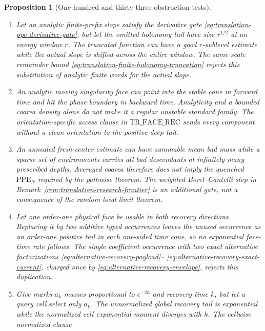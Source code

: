 \documentclass[11pt]{article}
\newtheorem{proposition}[theorem]{Proposition}
\begin{document}
\begin{proposition}[One hundred and thirty-three obstruction tests]
\begin{enumerate}[label=\textup{(T\arabic*)}]
      mixes, but their total signed bound need not decay.  The strict rate
      \eqref{eq:face-time-recovered-rate} rejects the missing aggregate
      complexity gap.
\item Let an analytic finite-prefix slope satisfy the derivative gate
      \eqref{eq:translation-ppe-derivative-gate}, but let the omitted
      holonomy tail have size $r^{1/2}$ at an energy window $r$.  The
      truncated function can have a good $r$-sublevel estimate while the
      actual slope is shifted across the entire window.  The same-scale
      remainder bound
      \eqref{eq:translation-finite-holonomy-truncation} rejects this
      substitution of analytic finite words for the actual slope.
\item An analytic moving singularity face can point into the stable cone in
      forward time and hit the phase boundary in backward time.  Analyticity
      and a bounded coarea density alone do not make it a regular unstable
      standard family.  The orientation-specific access clause in
      $\mathrm{TR\_FACE\_REC}$ sends every component without a clean
      orientation to the positive deep tail.
\item An annealed fresh-center estimate can have summable mean bad mass while
      a sparse set of environments carries all bad descendants at infinitely
      many prescribed depths.  Averaged coarea therefore does not imply the
      quenched $\mathrm{PPE}_{N}$ required by the pathwise theorem.  The
      weighted Borel--Cantelli step in
      Remark~\ref{rem:translation-research-frontier} is an additional gate,
      not a consequence of the random local limit theorem.
\item Let one order-one physical face be usable in both recovery directions.
      Replacing it by two additive typed occurrences leaves the unused
      occurrence as an order-one positive tail in each one-sided time cone,
      so no exponential face-time rate follows.  The single coefficient
      occurrence with two exact alternative factorizations
      \eqref{eq:alternative-recovery-payload}--
      \eqref{eq:alternative-recovery-exact-current}, charged once by
      \eqref{eq:alternative-recovery-envelope}, rejects this duplication.
\item Give marks $a_k$ masses proportional to $e^{-2k}$ and recovery time
      $k$, but let a query cell select only $a_k$.  The unnormalized global
      recovery tail is exponential while the normalized cell exponential
      moment diverges with $k$.  The cellwise normalized clause

\end{enumerate}
\end{proposition}
\end{document}
